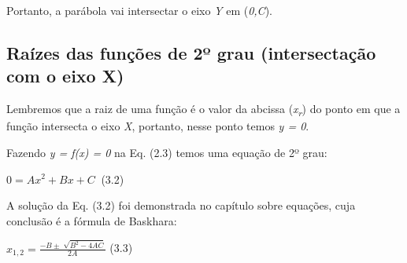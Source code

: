 Portanto, a parábola vai intersectar o eixo \textit{Y} em (\textit{0,C}).

\subsection{Raízes das funções de 2º grau (intersectação com o eixo X)}

Lembremos que a raiz de uma função é o valor da abcissa (\textit{x\textsubscript{r}}) do ponto em que a função intersecta o eixo \textit{X}, portanto, nesse ponto temos \textit{y = 0}. 

Fazendo \textit{y = f(x) = 0}  na Eq. (2.3) temos uma equação de 2º grau:

   \( 0=Ax^{2}+Bx+C_{~ } \) \tab (3.2)

A solução da Eq. (3.2) foi demonstrada no capítulo sobre equações, cuja conclusão  é a fórmula de Baskhara:

 \( x_{1,2}=\frac{-B \pm \sqrt[]{B^{2}-4AC}}{2A} \) \tab (3.3)

